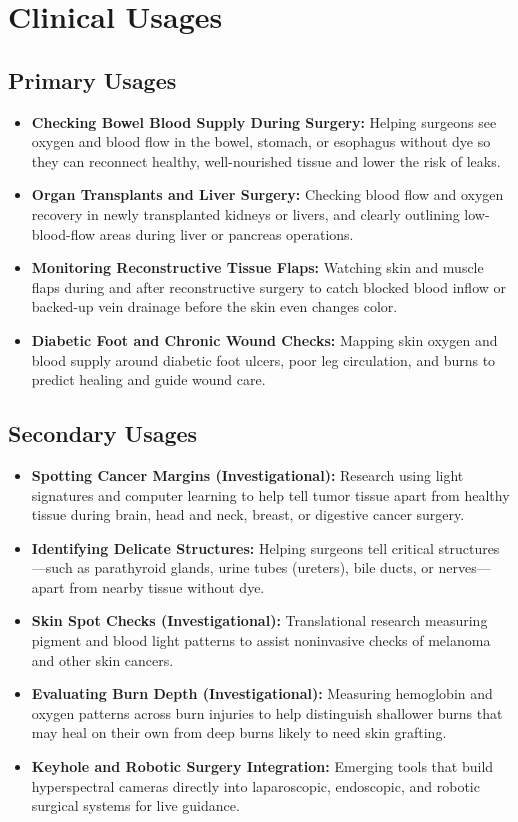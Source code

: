\section{Clinical Usages}

\subsection{Primary Usages}
\begin{itemize}
    \item \textbf{Checking Bowel Blood Supply During Surgery:} Helping surgeons see oxygen and blood flow in the bowel, stomach, or esophagus without dye so they can reconnect healthy, well-nourished tissue and lower the risk of leaks.
    \item \textbf{Organ Transplants and Liver Surgery:} Checking blood flow and oxygen recovery in newly transplanted kidneys or livers, and clearly outlining low-blood-flow areas during liver or pancreas operations.
    \item \textbf{Monitoring Reconstructive Tissue Flaps:} Watching skin and muscle flaps during and after reconstructive surgery to catch blocked blood inflow or backed-up vein drainage before the skin even changes color.
    \item \textbf{Diabetic Foot and Chronic Wound Checks:} Mapping skin oxygen and blood supply around diabetic foot ulcers, poor leg circulation, and burns to predict healing and guide wound care.
\end{itemize}

\subsection{Secondary Usages}
\begin{itemize}
    \item \textbf{Spotting Cancer Margins (Investigational):} Research using light signatures and computer learning to help tell tumor tissue apart from healthy tissue during brain, head and neck, breast, or digestive cancer surgery.
    \item \textbf{Identifying Delicate Structures:} Helping surgeons tell critical structures---such as parathyroid glands, urine tubes (ureters), bile ducts, or nerves---apart from nearby tissue without dye.
    \item \textbf{Skin Spot Checks (Investigational):} Translational research measuring pigment and blood light patterns to assist noninvasive checks of melanoma and other skin cancers.
    \item \textbf{Evaluating Burn Depth (Investigational):} Measuring hemoglobin and oxygen patterns across burn injuries to help distinguish shallower burns that may heal on their own from deep burns likely to need skin grafting.
    \item \textbf{Keyhole and Robotic Surgery Integration:} Emerging tools that build hyperspectral cameras directly into laparoscopic, endoscopic, and robotic surgical systems for live guidance.
\end{itemize}

